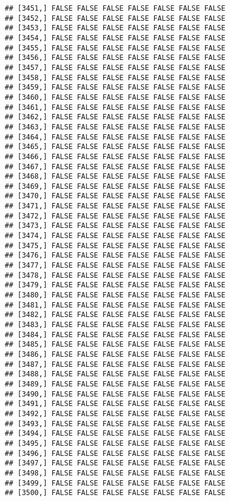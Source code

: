 \documentclass[
]{article}
\begin{document}
\begin{verbatim}
## [3451,] FALSE FALSE FALSE FALSE FALSE FALSE FALSE
## [3452,] FALSE FALSE FALSE FALSE FALSE FALSE FALSE
## [3453,] FALSE FALSE FALSE FALSE FALSE FALSE FALSE
## [3454,] FALSE FALSE FALSE FALSE FALSE FALSE FALSE
## [3455,] FALSE FALSE FALSE FALSE FALSE FALSE FALSE
## [3456,] FALSE FALSE FALSE FALSE FALSE FALSE FALSE
## [3457,] FALSE FALSE FALSE FALSE FALSE FALSE FALSE
## [3458,] FALSE FALSE FALSE FALSE FALSE FALSE FALSE
## [3459,] FALSE FALSE FALSE FALSE FALSE FALSE FALSE
## [3460,] FALSE FALSE FALSE FALSE FALSE FALSE FALSE
## [3461,] FALSE FALSE FALSE FALSE FALSE FALSE FALSE
## [3462,] FALSE FALSE FALSE FALSE FALSE FALSE FALSE
## [3463,] FALSE FALSE FALSE FALSE FALSE FALSE FALSE
## [3464,] FALSE FALSE FALSE FALSE FALSE FALSE FALSE
## [3465,] FALSE FALSE FALSE FALSE FALSE FALSE FALSE
## [3466,] FALSE FALSE FALSE FALSE FALSE FALSE FALSE
## [3467,] FALSE FALSE FALSE FALSE FALSE FALSE FALSE
## [3468,] FALSE FALSE FALSE FALSE FALSE FALSE FALSE
## [3469,] FALSE FALSE FALSE FALSE FALSE FALSE FALSE
## [3470,] FALSE FALSE FALSE FALSE FALSE FALSE FALSE
## [3471,] FALSE FALSE FALSE FALSE FALSE FALSE FALSE
## [3472,] FALSE FALSE FALSE FALSE FALSE FALSE FALSE
## [3473,] FALSE FALSE FALSE FALSE FALSE FALSE FALSE
## [3474,] FALSE FALSE FALSE FALSE FALSE FALSE FALSE
## [3475,] FALSE FALSE FALSE FALSE FALSE FALSE FALSE
## [3476,] FALSE FALSE FALSE FALSE FALSE FALSE FALSE
## [3477,] FALSE FALSE FALSE FALSE FALSE FALSE FALSE
## [3478,] FALSE FALSE FALSE FALSE FALSE FALSE FALSE
## [3479,] FALSE FALSE FALSE FALSE FALSE FALSE FALSE
## [3480,] FALSE FALSE FALSE FALSE FALSE FALSE FALSE
## [3481,] FALSE FALSE FALSE FALSE FALSE FALSE FALSE
## [3482,] FALSE FALSE FALSE FALSE FALSE FALSE FALSE
## [3483,] FALSE FALSE FALSE FALSE FALSE FALSE FALSE
## [3484,] FALSE FALSE FALSE FALSE FALSE FALSE FALSE
## [3485,] FALSE FALSE FALSE FALSE FALSE FALSE FALSE
## [3486,] FALSE FALSE FALSE FALSE FALSE FALSE FALSE
## [3487,] FALSE FALSE FALSE FALSE FALSE FALSE FALSE
## [3488,] FALSE FALSE FALSE FALSE FALSE FALSE FALSE
## [3489,] FALSE FALSE FALSE FALSE FALSE FALSE FALSE
## [3490,] FALSE FALSE FALSE FALSE FALSE FALSE FALSE
## [3491,] FALSE FALSE FALSE FALSE FALSE FALSE FALSE
## [3492,] FALSE FALSE FALSE FALSE FALSE FALSE FALSE
## [3493,] FALSE FALSE FALSE FALSE FALSE FALSE FALSE
## [3494,] FALSE FALSE FALSE FALSE FALSE FALSE FALSE
## [3495,] FALSE FALSE FALSE FALSE FALSE FALSE FALSE
## [3496,] FALSE FALSE FALSE FALSE FALSE FALSE FALSE
## [3497,] FALSE FALSE FALSE FALSE FALSE FALSE FALSE
## [3498,] FALSE FALSE FALSE FALSE FALSE FALSE FALSE
## [3499,] FALSE FALSE FALSE FALSE FALSE FALSE FALSE
## [3500,] FALSE FALSE FALSE FALSE FALSE FALSE FALSE

\end{verbatim}
\end{document}
